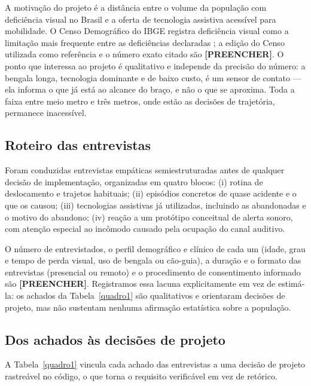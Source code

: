 \documentclass[12pt]{article}
\begin{document}
A motivação do projeto é a distância entre o volume da população com
deficiência visual no Brasil e a oferta de tecnologia assistiva acessível para
mobilidade. O Censo Demográfico do IBGE registra deficiência visual como a
limitação mais frequente entre as deficiências declaradas
\cite{ibge2010}; a edição do Censo utilizada como referência e o número exato
citado são \textbf{[PREENCHER]}. O ponto que interessa ao projeto é
qualitativo e independe da precisão do número: a bengala longa, tecnologia
dominante e de baixo custo, é um sensor de contato --- ela informa o que já
está ao alcance do braço, e não o que se aproxima. Toda a faixa entre meio
metro e três metros, onde estão as decisões de trajetória, permanece
inacessível.

\subsection{Roteiro das entrevistas}

Foram conduzidas entrevistas empáticas semiestruturadas antes de qualquer
decisão de implementação, organizadas em quatro blocos: (i) rotina de
deslocamento e trajetos habituais; (ii) episódios concretos de quase acidente
e o que os causou; (iii) tecnologias assistivas já utilizadas, incluindo as
abandonadas e o motivo do abandono; (iv) reação a um protótipo conceitual de
alerta sonoro, com atenção especial ao incômodo causado pela ocupação do canal
auditivo.

O número de entrevistados, o perfil demográfico e clínico de cada um (idade,
grau e tempo de perda visual, uso de bengala ou cão-guia), a duração e o
formato das entrevistas (presencial ou remoto) e o procedimento de
consentimento informado são \textbf{[PREENCHER]}. Registramos essa lacuna
explicitamente em vez de estimá-la: os achados da Tabela~\ref{quadro1} são qualitativos e
orientaram decisões de projeto, mas não sustentam nenhuma afirmação
estatística sobre a população.

\subsection{Dos achados às decisões de projeto}

A Tabela~\ref{quadro1} vincula cada achado das entrevistas a uma decisão de projeto
rastreável no código, o que torna o requisito verificável em vez de retórico.
\end{document}
